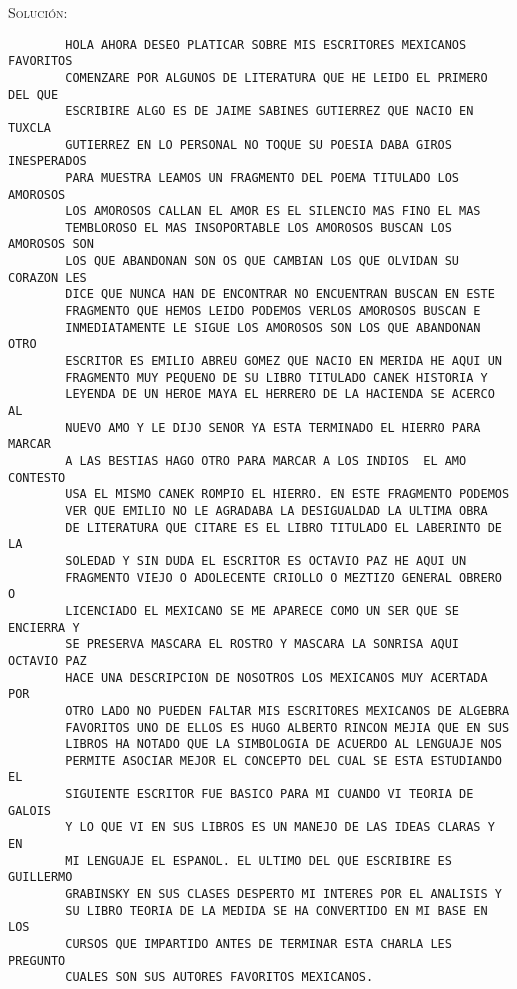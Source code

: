 \documentclass[letterpaper,11pt]{article}
\begin{document}
\begin{enumerate}
\begin{enumerate}
        \textsc{Solución:}
        \begin{verbatim}
        HOLA AHORA DESEO PLATICAR SOBRE MIS ESCRITORES MEXICANOS FAVORITOS 
        COMENZARE POR ALGUNOS DE LITERATURA QUE HE LEIDO EL PRIMERO DEL QUE 
        ESCRIBIRE ALGO ES DE JAIME SABINES GUTIERREZ QUE NACIO EN TUXCLA    
        GUTIERREZ EN LO PERSONAL NO TOQUE SU POESIA DABA GIROS INESPERADOS 
        PARA MUESTRA LEAMOS UN FRAGMENTO DEL POEMA TITULADO LOS AMOROSOS 
        LOS AMOROSOS CALLAN EL AMOR ES EL SILENCIO MAS FINO EL MAS 
        TEMBLOROSO EL MAS INSOPORTABLE LOS AMOROSOS BUSCAN LOS AMOROSOS SON 
        LOS QUE ABANDONAN SON OS QUE CAMBIAN LOS QUE OLVIDAN SU CORAZON LES 
        DICE QUE NUNCA HAN DE ENCONTRAR NO ENCUENTRAN BUSCAN EN ESTE 
        FRAGMENTO QUE HEMOS LEIDO PODEMOS VERLOS AMOROSOS BUSCAN E   
        INMEDIATAMENTE LE SIGUE LOS AMOROSOS SON LOS QUE ABANDONAN OTRO 
        ESCRITOR ES EMILIO ABREU GOMEZ QUE NACIO EN MERIDA HE AQUI UN     
        FRAGMENTO MUY PEQUENO DE SU LIBRO TITULADO CANEK HISTORIA Y 
        LEYENDA DE UN HEROE MAYA EL HERRERO DE LA HACIENDA SE ACERCO AL 
        NUEVO AMO Y LE DIJO SENOR YA ESTA TERMINADO EL HIERRO PARA MARCAR 
        A LAS BESTIAS HAGO OTRO PARA MARCAR A LOS INDIOS  EL AMO CONTESTO    
        USA EL MISMO CANEK ROMPIO EL HIERRO. EN ESTE FRAGMENTO PODEMOS  
        VER QUE EMILIO NO LE AGRADABA LA DESIGUALDAD LA ULTIMA OBRA 
        DE LITERATURA QUE CITARE ES EL LIBRO TITULADO EL LABERINTO DE LA 
        SOLEDAD Y SIN DUDA EL ESCRITOR ES OCTAVIO PAZ HE AQUI UN 
        FRAGMENTO VIEJO O ADOLECENTE CRIOLLO O MEZTIZO GENERAL OBRERO O     
        LICENCIADO EL MEXICANO SE ME APARECE COMO UN SER QUE SE ENCIERRA Y 
        SE PRESERVA MASCARA EL ROSTRO Y MASCARA LA SONRISA AQUI OCTAVIO PAZ 
        HACE UNA DESCRIPCION DE NOSOTROS LOS MEXICANOS MUY ACERTADA POR 
        OTRO LADO NO PUEDEN FALTAR MIS ESCRITORES MEXICANOS DE ALGEBRA 
        FAVORITOS UNO DE ELLOS ES HUGO ALBERTO RINCON MEJIA QUE EN SUS 
        LIBROS HA NOTADO QUE LA SIMBOLOGIA DE ACUERDO AL LENGUAJE NOS 
        PERMITE ASOCIAR MEJOR EL CONCEPTO DEL CUAL SE ESTA ESTUDIANDO EL 
        SIGUIENTE ESCRITOR FUE BASICO PARA MI CUANDO VI TEORIA DE GALOIS
        Y LO QUE VI EN SUS LIBROS ES UN MANEJO DE LAS IDEAS CLARAS Y EN 
        MI LENGUAJE EL ESPANOL. EL ULTIMO DEL QUE ESCRIBIRE ES GUILLERMO 
        GRABINSKY EN SUS CLASES DESPERTO MI INTERES POR EL ANALISIS Y
        SU LIBRO TEORIA DE LA MEDIDA SE HA CONVERTIDO EN MI BASE EN LOS  
        CURSOS QUE IMPARTIDO ANTES DE TERMINAR ESTA CHARLA LES PREGUNTO 
        CUALES SON SUS AUTORES FAVORITOS MEXICANOS.
        \end{verbatim}
    \end{enumerate}
    

\end{enumerate}
\end{document}
